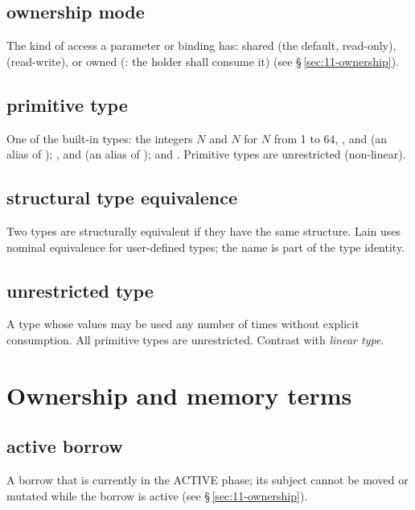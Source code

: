 \subsection*{ownership mode}
The kind of access a parameter or binding has: shared (the default, read-only),
 (read-write), or owned (: the holder shall consume it)
(see \S\,\ref{sec:11-ownership}).

\subsection*{primitive type}
One of the built-in types: the integers $N$ and $N$ for $N$ from 1 to 64,
,  and  (an alias of ); ,  and
 (an alias of ); and .  Primitive types are unrestricted
(non-linear).

\subsection*{structural type equivalence}
Two types are structurally equivalent if they have the same structure.
Lain uses nominal equivalence for user-defined types; the name is part of
the type identity.

\subsection*{unrestricted type}
A type whose values may be used any number of times without explicit
consumption.  All primitive types are unrestricted.  Contrast with
\textit{linear type}.

\section{Ownership and memory terms}
\label{sec:terms.ownership}

\subsection*{active borrow}
A borrow that is currently in the ACTIVE phase; its subject cannot be moved
or mutated while the borrow is active (see \S\,\ref{sec:11-ownership}).


